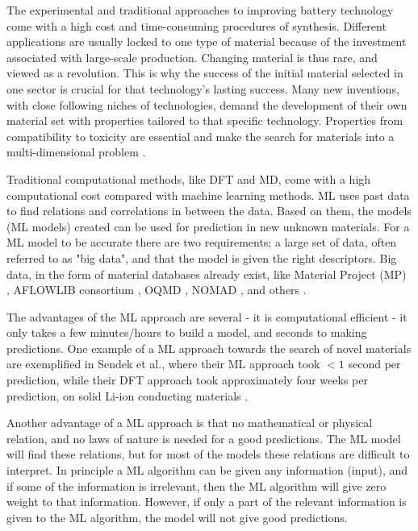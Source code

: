 
The experimental and traditional approaches to improving battery technology come with a high cost and time-consuming procedures of synthesis. Different applications are usually locked to one type of material because of the investment associated with large-scale production. Changing material is thus rare, and viewed as a revolution. This is why the success of the initial material selected in one sector is crucial for that technology's lasting success. Many new inventions, with close following niches of technologies, demand the development of their own material set with properties tailored to that specific technology. Properties from compatibility to toxicity are essential and make the search for materials into a multi-dimensional problem \cite{curtarolo2013high}. 

Traditional computational methods, like DFT and MD, come with a high computational cost compared with machine learning methods. ML uses past data to find relations and correlations in between the data. Based on them, the models (ML models) created can be used for prediction in new unknown materials. For a ML model to be accurate there are two requirements; a large set of data, often referred to as "big data", and that the model is given the right descriptors. Big data, in the form of material databases already exist, like Material Project (\ac{MP}) \cite{Jain2013}, AFLOWLIB consortium \cite{curtarolo2012aflowlib}, OQMD \cite{saal2013materials}, NOMAD \cite{draxl2018nomad}, and others \cite{schleder2019dft}.  

The advantages of the ML approach are several - it is computational efficient - it only takes a few minutes/hours to build a model, and seconds to making predictions. One example of a ML approach towards  the search of novel materials are exemplified in Sendek et al., where their ML approach took $<1$ second per prediction, while their DFT approach took approximately four weeks per prediction, on solid Li-ion conducting materials \cite{sendek2018machine}. 

Another advantage of a ML approach is that no mathematical or physical relation, and no laws of nature is needed for a good predictions. The ML model will find these relations, but for most of the models these relations are difficult to interpret. In principle a ML algorithm can be given any information (input), and if some of the information is irrelevant, then the ML algorithm will give zero weight to that information. However, if only a part of the relevant information is given to the ML algorithm, the model will not give good predictions.  

